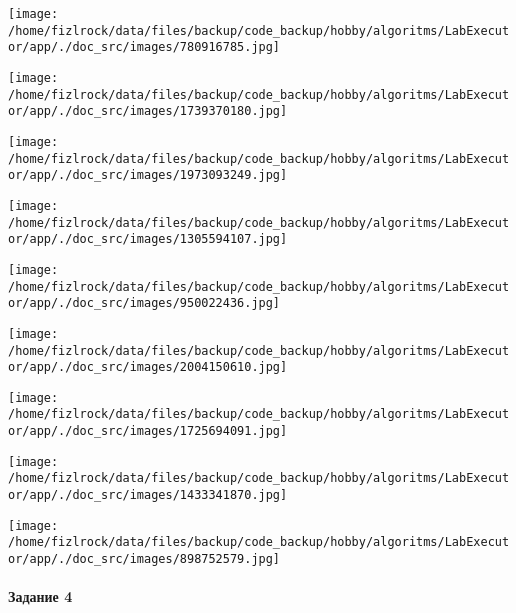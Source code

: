 \documentclass[a4paper, 12pt]{article}
\begin{document}
\texttt{[image: /home/fizlrock/data/files/backup/code\_backup/hobby/algoritms/LabExecutor/app/./doc\_src/images/780916785.jpg]}

\texttt{[image: /home/fizlrock/data/files/backup/code\_backup/hobby/algoritms/LabExecutor/app/./doc\_src/images/1739370180.jpg]}

\texttt{[image: /home/fizlrock/data/files/backup/code\_backup/hobby/algoritms/LabExecutor/app/./doc\_src/images/1973093249.jpg]}

\texttt{[image: /home/fizlrock/data/files/backup/code\_backup/hobby/algoritms/LabExecutor/app/./doc\_src/images/1305594107.jpg]}

\texttt{[image: /home/fizlrock/data/files/backup/code\_backup/hobby/algoritms/LabExecutor/app/./doc\_src/images/950022436.jpg]}

\texttt{[image: /home/fizlrock/data/files/backup/code\_backup/hobby/algoritms/LabExecutor/app/./doc\_src/images/2004150610.jpg]}

\texttt{[image: /home/fizlrock/data/files/backup/code\_backup/hobby/algoritms/LabExecutor/app/./doc\_src/images/1725694091.jpg]}

\texttt{[image: /home/fizlrock/data/files/backup/code\_backup/hobby/algoritms/LabExecutor/app/./doc\_src/images/1433341870.jpg]}

\texttt{[image: /home/fizlrock/data/files/backup/code\_backup/hobby/algoritms/LabExecutor/app/./doc\_src/images/898752579.jpg]}
\pagebreak
\paragraph{Задание 4}
\end{document}
